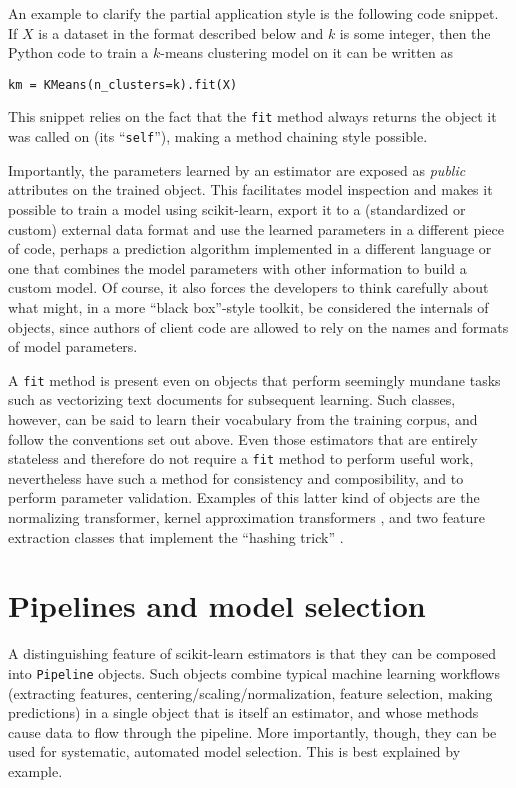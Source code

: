 \documentclass[a4paper]{article}
\begin{document}
An example to clarify the partial application style
is the following code snippet.
If $X$ is a dataset in the format described below and $k$ is some integer,
then the Python code to train a $k$-means clustering model on it
can be written as
\begin{verbatim}
km = KMeans(n_clusters=k).fit(X)
\end{verbatim}
This snippet relies on the fact that the \texttt{fit} method
always returns the object it was called on (its ``\texttt{self}''),
making a method chaining style possible.

Importantly, the parameters learned by an estimator
are exposed as \textit{public} attributes on the trained object.
This facilitates model inspection
and makes it possible to train a model using scikit-learn,
export it to a (standardized or custom) external data format
and use the learned parameters in a different piece of code,
perhaps a prediction algorithm implemented in a different language
or one that combines the model parameters with other information
to build a custom model.
Of course, it also forces the developers to think carefully
about what might, in a more ``black box''-style toolkit,
be considered the internals of objects,
since authors of client code are allowed to rely
on the names and formats of model parameters.

A \texttt{fit} method is present even on objects
that perform seemingly mundane tasks such as vectorizing text documents
for subsequent learning.
Such classes, however, can be said to learn their vocabulary
from the training corpus,
and follow the conventions set out above.
Even those estimators that are entirely stateless and therefore
do not require a \texttt{fit} method to perform useful work,
nevertheless have such a method for consistency and composibility,
and to perform parameter validation.
Examples of this latter kind of objects are the normalizing transformer,
kernel approximation transformers
\citep{rahimi2007random, li2010random, vedaldi2010efficient},
and two feature extraction classes that implement the ``hashing trick''
\citep{weinberger2009}.

\section{Pipelines and model selection}

A distinguishing feature of scikit-learn estimators
is that they can be composed into \texttt{Pipeline} objects.
Such objects combine typical machine learning workflows
(extracting features, centering/scaling/normalization,
feature selection, making predictions)
in a single object that is itself an estimator,
and whose methods cause data to flow through the pipeline.
More importantly, though, they can be used for
systematic, automated model selection.
This is best explained by example.
\end{document}
